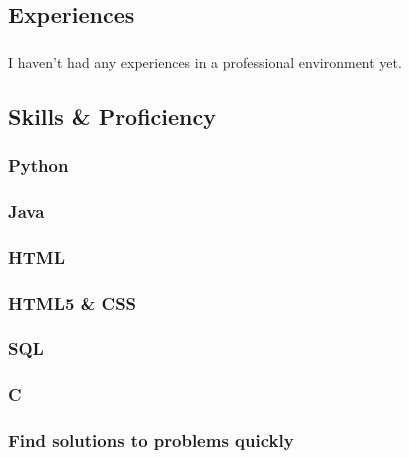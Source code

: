 \documentclass[]{article}
\begin{document}
\subsection{\texorpdfstring{{ \emph{} \emph{} }
Experiences}{    Experiences}}\label{experiences}

\subsubsection{}\label{section}

I haven't had any experiences in a professional environment yet.

\subsection{\texorpdfstring{{ \emph{} \emph{} } Skills \&
Proficiency}{    Skills \& Proficiency}}\label{skills-proficiency}

\subsubsection{Python}\label{python}

\subsubsection{Java}\label{java}

\subsubsection{HTML}\label{html}

\subsubsection{HTML5 \& CSS}\label{html5-css}

\subsubsection{SQL}\label{sql}

\subsubsection{C}\label{c}

\subsubsection{Find solutions to problems
quickly}\label{find-solutions-to-problems-quickly}
\end{document}
